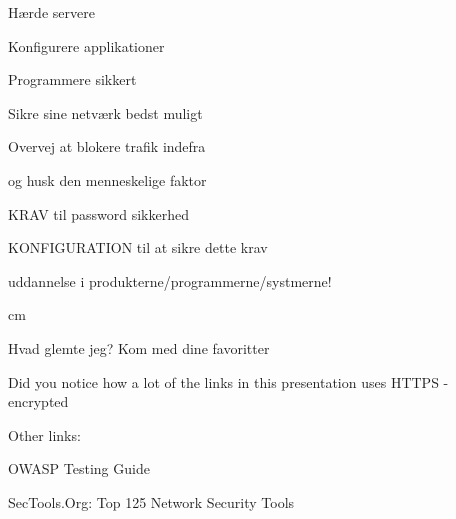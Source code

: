 \documentclass[20pt,landscape,a4paper,footrule]{foils}
\begin{document}
\begin{list1}
\item Hærde servere
\item Konfigurere applikationer
\item Programmere sikkert
\item Sikre sine netværk bedst muligt
\item Overvej at blokere trafik indefra
\item og husk den menneskelige faktor
\item KRAV til password sikkerhed
\item KONFIGURATION til at sikre dette krav
\item uddannelse i produkterne/programmerne/systmerne!
\end{list1}






 cm

\centerline{\Large Hvad glemte jeg? Kom med dine favoritter \smiley}

Did you notice how a lot of the links in this presentation uses HTTPS - encrypted

Other links:

OWASP Testing Guide\\

SecTools.Org: Top 125 Network Security Tools\\



\myquestionspage
\end{document}
